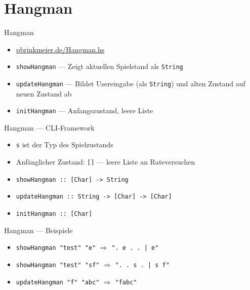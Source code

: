 \documentclass{beamer}
\begin{document}
\section{Hangman}

\begin{frame}{Hangman}
	\begin{itemize}
          \item \href{https://pbrinkmeier.de/Hangman.hs}{pbrinkmeier.de/Hangman.hs}
		\item \texttt{showHangman} --- Zeigt aktuellen Spielstand als \texttt{String}
		\item \texttt{updateHangman} --- Bildet Usereingabe (als \texttt{String}) und alten Zustand auf neuen Zustand ab
		\item \texttt{initHangman} --- Anfangszustand, leere Liste
	\end{itemize}
\end{frame}

\begin{frame}{Hangman --- CLI-Framework}

	\begin{itemize}
		\item \texttt{s} ist der Typ des Spielzustands
		\item Anfänglicher Zustand: \texttt{[]} --- leere Liste an Rateversuchen
                \item \texttt{showHangman :: [Char] -> String}
                \item \texttt{updateHangman :: String -> [Char] -> [Char]}
                \item \texttt{initHangman :: [Char]}
	\end{itemize}
\end{frame}

\begin{frame}{Hangman --- Beispiele}
	\begin{itemize}
          \item \texttt{showHangman "{}test"{} "{}e"{}} $\Rightarrow$ \texttt{"{}. e . . | e"{}}
          \item \texttt{showHangman "{}test"{} "{}sf"{}} $\Rightarrow$ \texttt{"{}. . s . | s f"{}}
          \item \texttt{updateHangman "{}f"{} "{}abc"{}} $\Rightarrow$ \texttt{"{}fabc"{}}
	\end{itemize}
\end{frame}
\end{document}
